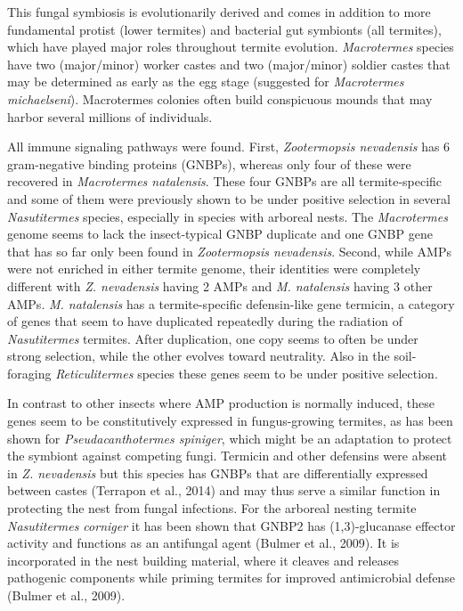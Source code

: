 \documentclass[11pt]{article}
\begin{document}
\begin{sloppypar}
This fungal symbiosis is evolutionarily derived and comes in addition to more fundamental protist (lower termites) and bacterial gut symbionts (all termites), which have played major roles throughout termite evolution. 
\textit{Macrotermes} species have two (major/minor) worker castes and two (major/minor) soldier castes that may be determined as early as the egg stage (suggested for \textit{Macrotermes michaelseni}). 
Macrotermes colonies often build conspicuous mounds that may harbor several millions of individuals.
\par
All immune signaling pathways were found. 
First, \textit{Zootermopsis nevadensis} has 6 gram-negative binding proteins (GNBPs), whereas only four of these were recovered in \textit{Macrotermes natalensis}. 
These four GNBPs are all termite-specific and some of them were previously shown to be under positive selection in several \textit{Nasutitermes} species, especially in species with arboreal nests. 
The \textit{Macrotermes} genome seems to lack the insect-typical GNBP duplicate and one GNBP gene that has so far only been found in \textit{Zootermopsis nevadensis}. 
Second, while AMPs were not enriched in either termite genome, their identities were completely different with \textit{Z. nevadensis} having 2 AMPs and \textit{M. natalensis} having 3 other AMPs. 
\textit{M. natalensis} has a termite-specific defensin-like gene termicin, a category of genes that seem to have duplicated repeatedly during the radiation of \textit{Nasutitermes} termites. 
After duplication, one copy seems to often be under strong selection, while the other evolves toward neutrality. 
Also in the soil-foraging \textit{Reticulitermes} species these genes seem to be under positive selection.
\par
In contrast to other insects where AMP production is normally induced, these genes seem to be constitutively expressed in fungus-growing termites, as has been shown for \textit{Pseudacanthotermes spiniger}, which might be an adaptation to protect the symbiont against competing fungi. 
Termicin and other defensins were absent in \textit{Z. nevadensis} but this species has GNBPs that are differentially expressed between castes (Terrapon et al., 2014) and may thus serve a similar function in protecting the nest from fungal infections. 
For the arboreal nesting termite \textit{Nasutitermes corniger} it has been shown that GNBP2 has (1,3)-glucanase effector activity and functions as an antifungal agent (Bulmer et al., 2009). 
It is incorporated in the nest building material, where it cleaves and releases pathogenic components while priming termites for improved antimicrobial defense (Bulmer et al., 2009). 

\end{sloppypar}
\end{document}
